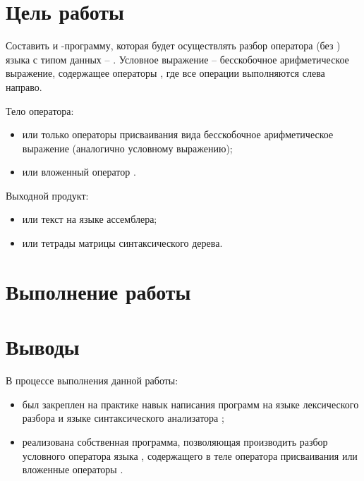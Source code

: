 





\tableofcontents
\newpage

\section{Цель работы}

Составить  и -программу, которая будет осуществлять разбор оператора  (без ) языка  с типом данных -- . Условное выражение -- бесскобочное арифметическое выражение, содержащее операторы \code{+ - * /}, где все операции выполняются слева направо. 

\noindent Тело оператора:

\begin{itemize}
	\item или только операторы присваивания вида  бесскобочное арифметическое выражение (аналогично условному выражению);
	\item или вложенный оператор .
\end{itemize}

\noindent Выходной продукт:

\begin{itemize}
	\item или текст на языке ассемблера;
	\item или тетрады матрицы синтаксического дерева.
\end{itemize}

\section{Выполнение работы}



\section{Выводы}

В процессе выполнения данной работы:

\begin{itemize}
	\item был закреплен на практике навык написания программ на языке лексического разбора  и языке синтаксического анализатора ;
	\item реализована собственная программа, позволяющая производить разбор условного оператора  языка , содержащего в теле оператора присваивания или вложенные операторы .
\end{itemize}


